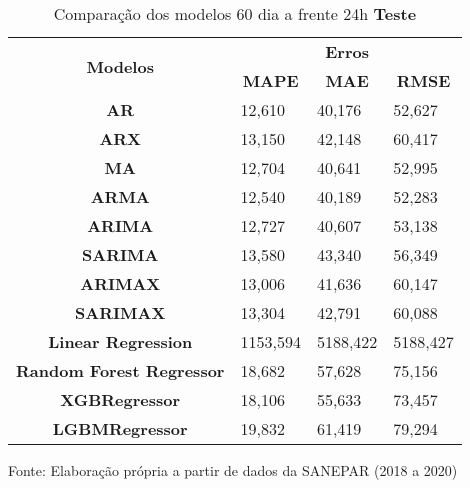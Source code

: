 \begin{table}[H]
	\centering
	\caption{Comparação dos modelos 60 dia a frente 24h \textbf{Teste} }\label{tb:60-24tst}
	\begin{tabular}{@{}clll@{}}
		\toprule
		\multirow{2}{*}{\textbf{Modelos}} & \multicolumn{3}{c}{\textbf{Erros}}                                                                       \\ \cmidrule(l){2-4} 
		& \multicolumn{1}{c}{\textbf{MAPE}} & \multicolumn{1}{c}{\textbf{MAE}} & \multicolumn{1}{c}{\textbf{RMSE}} \\ \hline
\textbf{AR}                       & 12,610                            & 40,176                           & 52,627                            \\
\textbf{ARX}                      & 13,150                            & 42,148                           & 60,417                            \\
\textbf{MA}                       & 12,704                            & 40,641                           & 52,995                            \\
\textbf{ARMA}                     & 12,540                            & 40,189                           & 52,283                            \\
\textbf{ARIMA}                    & 12,727                            & 40,607                           & 53,138                            \\
\textbf{SARIMA}                   & 13,580                            & 43,340                           & 56,349                            \\
\textbf{ARIMAX}                   & 13,006                            & 41,636                           & 60,147                            \\
\textbf{SARIMAX}                  & 13,304                            & 42,791                           & 60,088                            \\
\textbf{Linear Regression}        & 1153,594                          & 5188,422                         & 5188,427                          \\
\textbf{Random Forest Regressor}  & 18,682                            & 57,628                           & 75,156                            \\
\textbf{XGBRegressor}             & 18,106                            & 55,633                           & 73,457                            \\
\textbf{LGBMRegressor}            & 19,832                            & 61,419                           & 79,294                            \\ \hline
	\end{tabular}

Fonte: Elaboração própria a partir de dados da SANEPAR (2018 a 2020)
\end{table}

